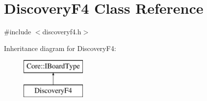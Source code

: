 \hypertarget{class_discovery_f4}{\section{\-Discovery\-F4 \-Class \-Reference}
\label{class_discovery_f4}
}


{\ttfamily \#include $<$discoveryf4.\-h$>$}

\-Inheritance diagram for \-Discovery\-F4\-:\begin{figure}[H]
\begin{center}
\leavevmode
\includegraphics[height=2.000000cm]{class_discovery_f4}
\end{center}
\end{figure}
